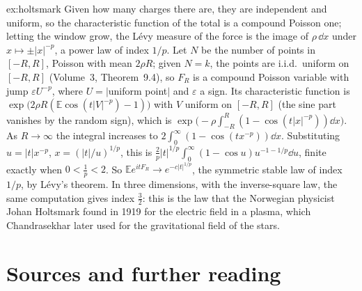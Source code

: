 \begin{solution}{ex:holtsmark}
\idea Given how many charges there are, they are independent and uniform, so the characteristic function of the total is a compound Poisson one;
letting the window grow, the L\'evy measure of the force is the image of $\rho\,\dd x$ under $x\mapsto\pm|x|^{-p}$, a power law of index $1/p$.
\writeup Let $N$ be the number of points in $[-R,R]$, Poisson with mean $2\rho R$; given $N=k$, the points are i.i.d.\ uniform on $[-R,R]$ (Volume~3, Theorem~9.4),
so $F_R$ is a compound Poisson variable with jump $\varepsilon U^{-p}$, where $U=|$uniform point$|$ and $\varepsilon$ a sign. Its characteristic function is
$\exp\bigl(2\rho R(\mathbb E\cos(t|V|^{-p})-1)\bigr)$ with $V$ uniform on $[-R,R]$ (the sine part vanishes by the random sign), which is
$\exp\bigl(-\rho\int_{-R}^R(1-\cos(t|x|^{-p}))\dd x\bigr)$. As $R\to\infty$ the integral increases to $2\int_0^\infty(1-\cos(tx^{-p}))\dd x$. Substituting $u=|t|x^{-p}$,
$x=(|t|/u)^{1/p}$, this is $\frac2p|t|^{1/p}\int_0^\infty(1-\cos u)u^{-1-1/p}\dd u$, finite exactly when $0<\frac1p<2$. So $\mathbb Ee^{itF_R}\to e^{-c|t|^{1/p}}$, the
symmetric stable law of index $1/p$, by L\'evy's theorem. In three dimensions, with the inverse-square law, the same computation gives index $\frac32$: this is
the law that the Norwegian physicist Johan Holtsmark found in 1919 for the electric field in a plasma, which Chandrasekhar later used for the gravitational
field of the stars.
\end{solution}

\section*{Sources and further reading}

